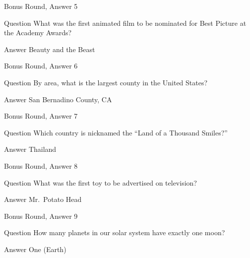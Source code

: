 \documentclass[11pt]{beamer}
\begin{document}
\begin{frame}[t]{Bonus Round, Answer 5}
\vspace{2em}
\begin{block}{Question}
What was the first animated film to be nominated for Best Picture at the Academy Awards\@?
\end{block}
\pause{}
\begin{block}{Answer}
Beauty and the Beast
\end{block}
\end{frame}
    

\begin{frame}[t]{Bonus Round, Answer 6}
\vspace{2em}
\begin{block}{Question}
By area, what is the largest county in the United States\@?
\end{block}
\pause{}
\begin{block}{Answer}
San Bernadino County, CA
\end{block}
\end{frame}
    

\begin{frame}[t]{Bonus Round, Answer 7}
\vspace{2em}
\begin{block}{Question}
Which country is nicknamed the ``Land of a Thousand Smiles?''
\end{block}
\pause{}
\begin{block}{Answer}
Thailand
\end{block}
\end{frame}
    

\begin{frame}[t]{Bonus Round, Answer 8}
\vspace{2em}
\begin{block}{Question}
What was the first toy to be advertised on television\@?
\end{block}
\pause{}
\begin{block}{Answer}
Mr.\ Potato Head
\end{block}
\end{frame}
    

\begin{frame}[t]{Bonus Round, Answer 9}
\vspace{2em}
\begin{block}{Question}
How many planets in our solar system have exactly one moon\@?
\end{block}
\pause{}
\begin{block}{Answer}
One (Earth)
\end{block}
\end{frame}
    
\end{document}
